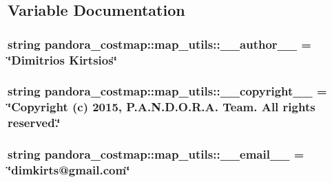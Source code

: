 \subsection{\-Variable \-Documentation}
\hypertarget{namespacepandora__costmap_1_1map__utils_a031fac51be6c934bc7626b019126c672}{
\subsubsection[{\-\_\-\-\_\-author\-\_\-\-\_\-}]{\setlength{\rightskip}{0pt plus 5cm}string {\bf pandora\-\_\-costmap\-::map\-\_\-utils\-::\-\_\-\-\_\-author\-\_\-\-\_\-} = \char`\"{}\-Dimitrios \-Kirtsios\char`\"{}}}\label{namespacepandora__costmap_1_1map__utils_a031fac51be6c934bc7626b019126c672}
\hypertarget{namespacepandora__costmap_1_1map__utils_a744bfb25ed3cd3974a7fe7c552d5dfa5}{
\subsubsection[{\-\_\-\-\_\-copyright\-\_\-\-\_\-}]{\setlength{\rightskip}{0pt plus 5cm}string {\bf pandora\-\_\-costmap\-::map\-\_\-utils\-::\-\_\-\-\_\-copyright\-\_\-\-\_\-} = \char`\"{}\-Copyright (c) 2015, \-P.\-A.\-N.\-D.\-O.\-R.\-A. \-Team. \-All rights reserved.\char`\"{}}}\label{namespacepandora__costmap_1_1map__utils_a744bfb25ed3cd3974a7fe7c552d5dfa5}
\hypertarget{namespacepandora__costmap_1_1map__utils_a80a136cf88b6006e4f0f546cf90b1768}{
\subsubsection[{\-\_\-\-\_\-email\-\_\-\-\_\-}]{\setlength{\rightskip}{0pt plus 5cm}string {\bf pandora\-\_\-costmap\-::map\-\_\-utils\-::\-\_\-\-\_\-email\-\_\-\-\_\-} = \char`\"{}dimkirts@gmail.\-com\char`\"{}}}\label{namespacepandora__costmap_1_1map__utils_a80a136cf88b6006e4f0f546cf90b1768}
